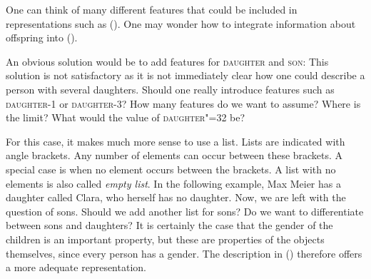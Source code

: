 One can think of many different features that could be included in representations such as (). One may wonder how
to integrate information about offspring into ().

An obvious solution would be to add features for \textsc{daughter} and \textsc{son}:
\ea
{}
\z
This solution is not satisfactory as it is not immediately clear how one could describe a person with several daughters.
Should one really introduce features such as \textsc{daughter-1} or \textsc{daughter-3}?
\ea
{}
\z
How many features do we want to assume? Where is the limit?
What would the value of \textsc{daughter"=32} be?

For this case, it makes much more sense to use a list. Lists are indicated with angle brackets. Any number of elements can occur between
these brackets. A special case is when no element occurs between the brackets. A list with no
elements is also called \emph{empty list}. In the following example,
Max Meier has a daughter called Clara, who herself has no daughter.
\ea
{}
\z
Now, we are left with the question of sons. Should we add another list for sons? Do we want to differentiate between sons and daughters?
It is certainly the case that the gender of the children is an important property, but these are
properties of the objects themselves, since every person has a gender. The description in () therefore offers a more adequate representation.

